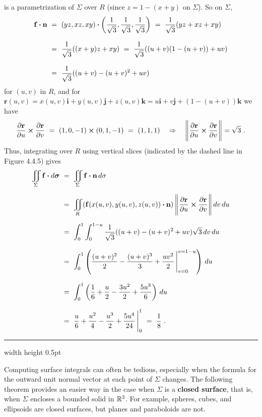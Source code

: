 \begin{exmp}
 is a parametrization of $\Sigma$ over $R$ (since $z=1-(x+y)$ on $\Sigma$). So on $\Sigma$,
 \begin{align*}
  \mathbf{f} \bm{\cdot} \mathbf{n} ~&=~
   (yz,xz,xy) \bm{\cdot} \left( \frac{1}{\sqrt{3}},\frac{1}{\sqrt{3}},\frac{1}{\sqrt{3}} \right)
   ~=~ \frac{1}{\sqrt{3}}(yz+xz+xy)\\[8pt]
   &=~ \frac{1}{\sqrt{3}}((x+y)z+xy)
   ~=~ \frac{1}{\sqrt{3}}((u+v)(1-(u+v))+uv)\\[8pt]
   &=~ \frac{1}{\sqrt{3}}((u+v)- (u+v)^2 + uv)
 \end{align*}
 for $(u,v)$ in $R$, and for $\mathbf{r}(u,v)=x(u,v)\mathbf{i} + y(u,v)\mathbf{j} + z(u,v)\mathbf{k} = u\mathbf{i} +
 v\mathbf{j} + (1-(u+v))\mathbf{k}$ we have
 \begin{displaymath}
  \frac{\partial \mathbf{r}}{\partial u} \bm{\times} \frac{\partial \mathbf{r}}{\partial v} ~=~
   (1,0,-1) \bm{\times} (0,1,-1) ~=~ (1,1,1) \quad\Rightarrow\quad
   \Biggl\lVert\mspace{1mu}\frac{\partial \mathbf{r}}{\partial u} \bm{\times} \frac{\partial \mathbf{r}}{\partial v}\mspace{1mu}\Biggr\rVert = \sqrt{3}~.
 \end{displaymath}
Thus, integrating over $R$ using vertical slices 
(indicated by the dashed line in Figure 4.4.5) 
gives
\begin{align*}
  \iint\limits_{\Sigma} \mathbf{f} \bm{\cdot} d\bm{\sigma} ~&=~
   \iint\limits_{\Sigma} \mathbf{f} \bm{\cdot} \mathbf{n}\,d\sigma\\[6pt]
   &=~ \iint\limits_{R} (\mathbf{f}(x(u,v),y(u,v),z(u,v)) \bm{\cdot} \mathbf{n})\,
    \Biggl\lVert\mspace{1mu}\frac{\partial \mathbf{r}}{\partial u} \bm{\times} \frac{\partial \mathbf{r}}{\partial v}\mspace{1mu}\Biggr\rVert\,dv\,du\\[6pt]
   &=~ \int_0^1 \int_0^{1-u} \frac{1}{\sqrt{3}}((u+v)- (u+v)^2 + uv) \sqrt{3}\,dv\,du\\[8pt]
   &=~ \int_0^1 \left( \frac{(u+v)^2}{2} - \frac{(u+v)^3}{3} + \frac{uv^2}{2}\,\Bigg|_{v=0}^{v=1-u} \right)\,du\\[8pt]
   &=~ \int_0^1 \left( \frac{1}{6} + \frac{u}{2} - \frac{3u^2}{2} + \frac{5u^3}{6} \right)\,du\\[8pt]
   &=~ \frac{u}{6} + \frac{u^2}{4} - \frac{u^3}{2} + \frac{5u^4}{24}\,\Bigg|_0^1 ~=~ \frac{1}{8}~.
 \end{align*}
\end{exmp}
\hrule width \textwidth height 0.5pt
\medskip

Computing surface integrals can often be tedious, especially when the formula for the outward unit normal vector at each point of $\Sigma$ changes. 
The following theorem provides an easier way in the case
when $\Sigma$ is a \textbf{closed surface}, that is, when $\Sigma$ encloses a bounded solid in $\mathbb{R}^{3}$. For example,
spheres, cubes, and ellipsoids are closed surfaces, but planes and paraboloids are not.

